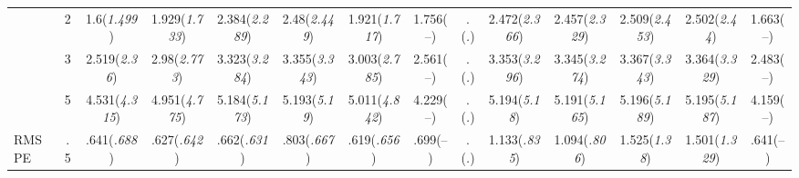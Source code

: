 \documentclass{article}
\begin{document}
\begin{table}[tbp]
{\begin{tabularx}{\textwidth}{lCCCCCCCCCCCCC}
&2&1.6\newline (\emph{1.499})&1.929\newline (\emph{1.733})&2.384\newline (\emph{2.289})&2.48\newline (\emph{2.449})&1.921\newline (\emph{1.717})&1.756\newline (--)&.\newline (\emph{.})&2.472\newline (\emph{2.366})&2.457\newline (\emph{2.329})&2.509\newline (\emph{2.453})&2.502\newline (\emph{2.44})&1.663\newline (--) \tabularnewline
&3&2.519\newline (\emph{2.36})&2.98\newline (\emph{2.773})&3.323\newline (\emph{3.284})&3.355\newline (\emph{3.343})&3.003\newline (\emph{2.785})&2.561\newline (--)&.\newline (\emph{.})&3.353\newline (\emph{3.296})&3.345\newline (\emph{3.274})&3.367\newline (\emph{3.343})&3.364\newline (\emph{3.329})&2.483\newline (--) \tabularnewline
&5&4.531\newline (\emph{4.315})&4.951\newline (\emph{4.775})&5.184\newline (\emph{5.173})&5.193\newline (\emph{5.19})&5.011\newline (\emph{4.842})&4.229\newline (--)&.\newline (\emph{.})&5.194\newline (\emph{5.18})&5.191\newline (\emph{5.165})&5.196\newline (\emph{5.189})&5.195\newline (\emph{5.187})&4.159\newline (--) \tabularnewline
\midrule RMSPE&.5&.641\newline (\emph{.688})&.627\newline (\emph{.642})&.662\newline (\emph{.631})&.803\newline (\emph{.667})&.619\newline (\emph{.656})&.699\newline (--)&.\newline (\emph{.})&1.133\newline (\emph{.835})&1.094\newline (\emph{.806})&1.525\newline (\emph{1.38})&1.501\newline (\emph{1.329})&.641\newline (--) \tabularnewline

\end{tabularx}}
\end{table}
\end{document}
